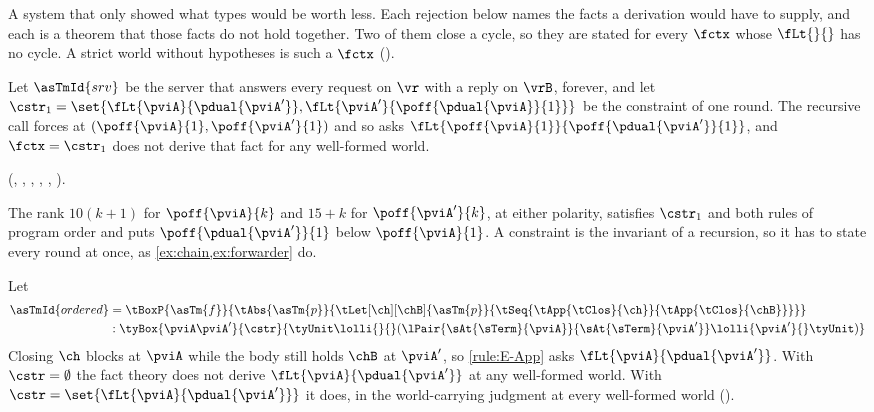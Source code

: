 A system that only showed what types would be worth less. Each
rejection below names the facts a derivation would have to supply, and
each is a theorem that those facts do not hold together. Two of them
close a cycle, so they are stated for every $\fctx$ whose $\fLt{}{}$ has
no cycle. A strict world without hypotheses is such a $\fctx$
().

\begin{theorem}
\label{thm:rej-rr}
  Let $\asTmId{srv}$ be the server that answers every request on
  $\vr$ with a reply on $\vrB$, forever, and let
  $\cstr_1 = \set{\fLt{\pviA}{\pdual{\pviA'}}, \fLt{\pviA'}{\poff{\pdual{\pviA}}{1}}}$
  be the constraint of one round. The recursive call forces at
  $(\poff{\pviA}{1}, \poff{\pviA'}{1})$ and so asks
  $\fLt{\poff{\pviA}{1}}{\poff{\pdual{\pviA'}}{1}}$, and
  $\fctx = \cstr_1$ does not derive that fact for any well-formed
  world.
\end{theorem}

(, , , , , ).

The rank $10(k+1)$ for $\poff{\pviA}{k}$ and $15+k$ for
$\poff{\pviA'}{k}$, at either polarity, satisfies $\cstr_1$ and both
rules of program order and puts $\poff{\pdual{\pviA'}}{1}$ below
$\poff{\pviA}{1}$.
A constraint is the
invariant of a recursion, so it has to state every round at once, as
\cref{ex:chain,ex:forwarder} do.

\begin{theorem}
\label{thm:rej-ord}
  Let
  \begin{align*}
    \asTmId{ordered} &= \tBoxP{\asTm{f}}{\tAbs{\asTm{p}}{%
      \tLet[\ch][\chB]{\asTm{p}}{\tSeq{\tApp{\tClos}{\ch}}{\tApp{\tClos}{\chB}}}}}
    \\
    &: \tyBox{\pviA \pviA'}{\cstr}{\tyUnit \lolli{}{}
      (\lPair{\sAt{\sTerm}{\pviA}}{\sAt{\sTerm}{\pviA'}}
        \lolli{\pviA'}{} \tyUnit)}
  \end{align*}
  Closing $\ch$ blocks at $\pviA$ while the body still holds $\chB$ at
  $\pviA'$, so \ref{rule:E-App} asks $\fLt{\pviA}{\pdual{\pviA'}}$. With
  $\cstr = \emptyset$ the fact theory does not derive
  $\fLt{\pviA}{\pdual{\pviA'}}$ at any well-formed world. With
  $\cstr = \set{\fLt{\pviA}{\pdual{\pviA'}}}$ it does, in the world-carrying
  judgment at every well-formed world ().
\end{theorem}

